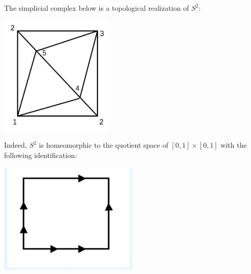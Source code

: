 \begin{example}
The simplicial complex below is a topological realization of \({S}^{2}\):
\begin{center}
\includegraphics[width=0.4\textwidth]{images/Ch4_S1_triangle.jpg}
\end{center}
Indeed, $S^2$ is homeomorphic to the quotient space of $[0,1] \times [0,1]$ with the following identification:
\begin{center}
\includegraphics[width=0.5\textwidth]{images/Ch4_S1_quotient.jpg}
\end{center}
\end{example}

